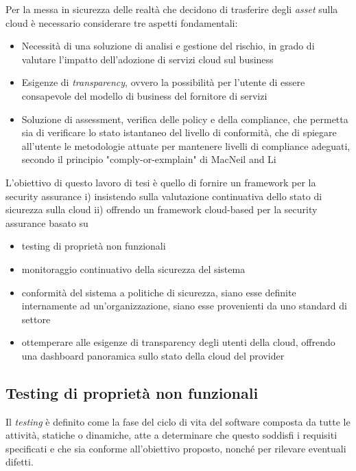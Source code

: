 \documentclass[../main.tex]{subfiles}
\begin{document}
Per la messa in sicurezza delle realtà che decidono di trasferire degli \textit{asset} sulla cloud è necessario considerare tre aspetti fondamentali:
\begin{itemize}
    \item Necessità di una soluzione di analisi e gestione del rischio, in grado di valutare l'impatto dell'adozione di servizi cloud sul business
    \item Esigenze di \textit{transparency}, ovvero la possibilità per l'utente di essere consapevole del modello di business del fornitore di servizi 
    \item Soluzione di assessment, verifica delle policy e della compliance, che permetta sia di verificare lo stato istantaneo del livello di conformità, che di spiegare all'utente le metodologie attuate per mantenere livelli di compliance adeguati, secondo il principio "comply-or-exmplain" di MacNeil and Li \cite{RePEc:bla:corgov:v:14:y:2006:i:5:p:486-496}
\end{itemize}

L'obiettivo di questo lavoro di tesi è quello di fornire un framework per la security assurance i) insistendo sulla valutazione continuativa dello stato di sicurezza sulla cloud ii) offrendo un framework cloud-based per la security assurance basato su
\begin{itemize}
    \item testing di proprietà non funzionali
    \item monitoraggio continuativo della sicurezza del sistema
    \item conformità del sistema a politiche di sicurezza, siano esse definite internamente ad un'organizzazione, siano esse provenienti da uno standard di settore 
    \item ottemperare alle esigenze di transparency degli utenti della cloud, offrendo una dashboard panoramica sullo stato della cloud del provider
\end{itemize}

\subsection{Testing di proprietà non funzionali}

Il \textit{testing} è definito come la fase del ciclo di vita del software composta da tutte le attività, statiche o dinamiche, atte a determinare che questo soddisfi i requisiti specificati e che sia conforme all'obiettivo proposto, nonché per rilevare eventuali difetti.
\end{document}

